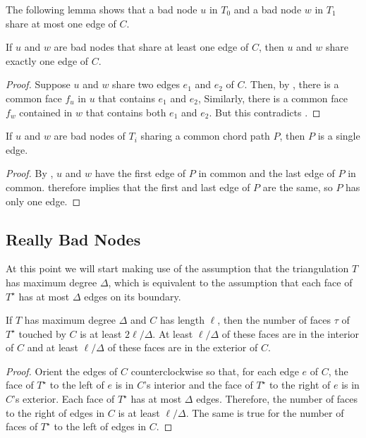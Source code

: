 \documentclass{patmorin}
\newcommand{\dual}[1]{{#1}^\star}
\begin{document}
The following lemma shows that a bad node $u$ in $T_0$ and a bad node $w$
in $T_1$ share at most one edge of $C$.

\begin{lem}
   If $u$ and $w$ are bad nodes that share at least one edge of $C$, then
   $u$ and $w$ share exactly one edge of $C$.
\end{lem}

\begin{proof}
   Suppose $u$ and $w$ share two edges $e_1$ and $e_2$ of $C$.  Then,
   by , there is a common face $f_u$ in $u$ that
   contains $e_1$ and $e_2$, Similarly, there is a common face $f_w$
   contained in $w$ that contains both $e_1$ and $e_2$.  But this
   contradicts .
\end{proof}


\begin{lem}
   If $u$ and $w$ are bad nodes of $T_i$ sharing a common chord path $P$,
   then $P$ is a single edge.
\end{lem}

\begin{proof}
   By , $u$ and $w$ have the first edge of $P$ in
   common and the last edge of $P$ in common.  
   therefore implies that the first and last edge of $P$ are the same,
   so $P$ has only one edge.
\end{proof}

\subsection{Really Bad Nodes}


At this point we will start making use of the assumption that the
triangulation $T$ has maximum degree $\Delta$, which is equivalent to
the assumption that each face of $\dual{T}$ has at most $\Delta$ edges
on its boundary.

\begin{obs}
  If $T$ has maximum degree $\Delta$ and $C$ has length $\ell$, then
  the number of faces $\tau$ of $\dual{T}$ touched by $C$ is at least 
  $2\ell/\Delta$.  At least $\ell/\Delta$ of these faces are in
  the interior of $C$ and at least $\ell/\Delta$ of these faces are
  in the exterior of $C$.
\end{obs}

\begin{proof}
  Orient the edges of $C$ counterclockwise so that, for each edge
  $e$ of $C$, the face of $\dual{T}$ to the left of $e$ is in $C$'s
  interior and the face of $\dual{T}$ to the right of $e$ is in $C$'s
  exterior.  Each face of $\dual{T}$ has at most $\Delta$ edges.
  Therefore, the number of faces to the right of edges in $C$ is
  at least $\ell/\Delta$. The same is true for the number of faces
  of $\dual{T}$ to the left of edges in $C$.
\end{proof}
\end{document}
